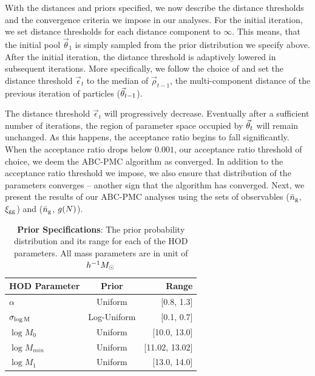 With the distances and priors specified, we now describe the distance thresholds and the 
convergence criteria we impose in our analyses. For the initial iteration, we set distance
thresholds for each distance component to $\infty$. This means, that the initial pool 
$\vec\theta_1$ is simply sampled from the prior distribution we specify above. After the initial 
iteration, the distance threshold is adaptively lowered in subsequent iterations. More 
specifically, we follow the choice of \cite{abcwl} and set the distance threshold 
$\vec\epsilon_t$ to the median of $\vec\rho_{t-1}$, the multi-component distance of the 
previous iteration of particles ($\vec{\theta}_{t-1}$).

The distance threshold $\vec\epsilon_t$ will progressively decrease. Eventually after a 
sufficient number of iterations, the region of parameter space occupied by $\vec{\theta}_t$ 
will remain unchanged. As this happens, the acceptance ratio begins to fall significantly. 
When the acceptance ratio drops below $0.001$, our acceptance ratio threshold of choice, 
we deem the ABC-PMC algorithm as converged. In addition to the acceptance ratio threshold 
we impose, we also ensure that distribution of the parameters converges -- another sign 
that the algorithm has converged. Next, we present the results of our ABC-PMC analyses 
using the sets of observables ($\bar{n}_{\mathrm{g}}$, $\xi_{\mathrm{gg}}$) and ($\bar{n}_{\mathrm{g}}$, $g(N)$). 


\begin{table}
	\centering
	\caption{{\bf Prior Specifications}: The prior probability distribution 
  and its range for each of the \citet{zheng07} HOD parameters. All mass parameters are in unit of $h^{-1}M_\odot$}
	\label{tab:prior}
	\begin{tabular}{lcr} %
		\hline
		HOD Parameter & Prior & Range\\
		\hline
		$\alpha$ & Uniform & [0.8, 1.3]\\
		$\sigma_{\rm \log M}$ & Log-Uniform & [0.1, 0.7]\\
		$\log M_{0}$ & Uniform & [10.0, 13.0]\\
        $\log M_{min}$ & Uniform & [11.02, 13.02]\\
        $\log M_{1}$ & Uniform & [13.0, 14.0]\\
		\hline
	\end{tabular}
\end{table}

